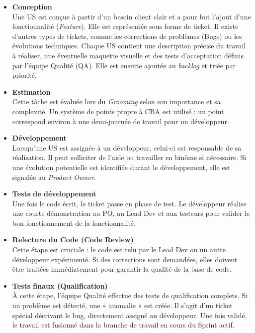 \documentclass{article}
\begin{document}
\begin{itemize}
    \item \textbf{Conception} \\
    Une US est conçue à partir d'un besoin client clair et a pour but l'ajout d'une fonctionnalité (\textit{Feature}). Elle est représentée sous forme de ticket. Il existe d'autres types de tickets, comme les corrections de problèmes (Bugs) ou les évolutions techniques. Chaque US contient une description précise du travail à réaliser, une éventuelle maquette visuelle et des tests d'acceptation définis par l'équipe Qualité (QA). Elle est ensuite ajoutée au \textit{backlog} et triée par priorité.

    \item \textbf{Estimation} \\
    Cette tâche est évaluée lors du \textit{Grooming} selon son importance et sa complexité. Un système de points propre à CBA est utilisé : un point correspond environ à une demi-journée de travail pour un développeur.

    \item \textbf{Développement} \\
    Lorsqu'une US est assignée à un développeur, celui-ci est responsable de sa réalisation. Il peut solliciter de l'aide ou travailler en binôme si nécessaire. Si une évolution potentielle est identifiée durant le développement, elle est signalée au \textit{Product Owner}.

    \item \textbf{Tests de développement} \\
    Une fois le code écrit, le ticket passe en phase de test. Le développeur réalise une courte démonstration au PO, au Lead Dev et aux testeurs pour valider le bon fonctionnement de la fonctionnalité.

    \item \textbf{Relecture du Code (Code Review)} \\
    Cette étape est cruciale : le code est relu par le Lead Dev ou un autre développeur expérimenté. Si des corrections sont demandées, elles doivent être traitées immédiatement pour garantir la qualité de la base de code.

    \item \textbf{Tests finaux (Qualification)} \\
    À cette étape, l'équipe Qualité effectue des tests de qualification complets. Si un problème est détecté, une « anomalie » est créée. Il s'agit d'un ticket spécial décrivant le bug, directement assigné au développeur. Une fois validé, le travail est fusionné dans la branche de travail en cours du Sprint actif.
\end{itemize}
\end{document}
